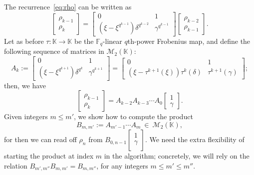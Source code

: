 \documentclass[12pt]{article}
\theoremstyle{plain}
\theoremstyle{definition}
\def\F{\ensuremath{\mathbb{F}}}
\def\K{\ensuremath{\mathbb{K}}}
\begin{document}
The recurrence~\eqref{eq:rho} can be written as
\[
\begin{bmatrix}
\rho_{k - 1} \\
\rho_{k} 
\end{bmatrix} = 
\begin{bmatrix}
0 & 1 \\
(\xi-\xi^{q^{k - 1}})\delta^{q^{k - 2}} & \gamma^{q^{k - 1}}
\end{bmatrix}
\begin{bmatrix}
\rho_{k - 2} \\
\rho_{k - 1} 
\end{bmatrix}.
\]
Let as before $\tau: \K \to
\K$ be the $\F_q$-linear $q$th-power Frobenius map,
and define the following sequence of matrices in 
$\mathscr{M}_2(\K)$:
\[
A_k :=\begin{bmatrix}
0 & 1 \\
(\xi-\xi^{q^{k + 1}})\delta^{q^{k }} & \gamma^{q^{k + 1}}
\end{bmatrix} =
\begin{bmatrix}
0 & 1 \\
(\xi-\tau^{k+1}(\xi)) \tau^{k}(\delta) &  \tau^{k+1}(\gamma)
\end{bmatrix}
;
\]
then, we have
\[
\begin{bmatrix}
\rho_{k - 1} \\
\rho_{k} 
\end{bmatrix} = 
A_{k-2}A_{k - 3} \cdots A_0
\begin{bmatrix}
1 \\
\gamma
\end{bmatrix}.
\]
Given integers $m \le m'$, we show how to compute the product 
\[B_{m,m'} := A_{m' - 1} \cdots A_m ~ \in ~ \mathscr{M}_2(\K),\]
for then we can read off $\rho_{n}$ from $B_{0,n-1}\left [\begin{smallmatrix}
1 \\
\gamma \\
\end{smallmatrix} \right ]$. We need the extra flexibility of 
starting the product at index $m$ in the algorithm; concretely, we will
rely on the relation $B_{m',m''}B_{m,m'}=B_{m,m''}$, for any
integers $m \le m' \le m''$. 
\end{document}
